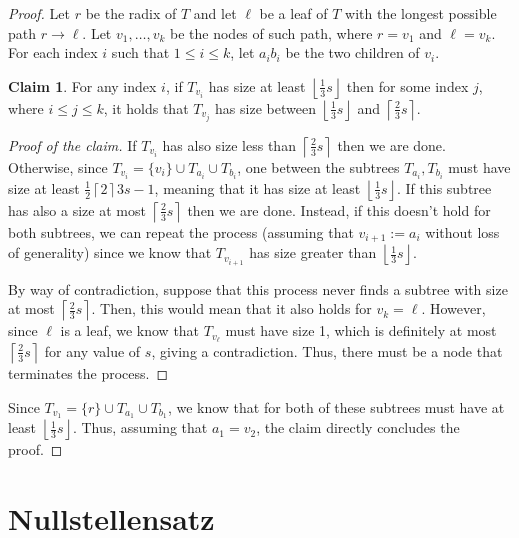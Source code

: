 \documentclass[12pt]{article}
\theoremstyle{definition}
\newtheorem{claimlemma}{Claim}[lemma]
\newcommand{\floor}[1]{\left \lfloor #1 \right \rfloor}
\newcommand{\ceil}[1]{\left \lceil #1 \right \rceil}
\begin{document}
    \begin{proof}
        Let $r$ be the radix of $T$ and let $\ell$ be a leaf of $T$ with the longest possible path $r \to \ell$. Let $v_1, \ldots, v_k$ be the nodes of such path, where $r = v_1$ and $\ell = v_k$. For each index $i$ such that $1 \leq i \leq k$, let $a_i b_i$ be the two children of $v_i$.

        \begin{claimlemma}
            For any index $i$, if $T_{v_i}$ has size at least $\floor{\frac{1}{3} s}$ then for some index $j$, where $i \leq j \leq k$, it holds that $T_{v_j}$ has size between $\floor{\frac{1}{3} s}$ and $\ceil{\frac{2}{3} s}$.
        \end{claimlemma}

        \begin{proof}[Proof of the claim]
            If $T_{v_i}$ has also size less than $\ceil{\frac{2}{3} s}$ then we are done. Otherwise, since $T_{v_i} = \{v_i\} \cup T_{a_i} \cup T_{b_i}$, one between the subtrees $T_{a_i}, T_{b_i}$ must have size at least $\frac{1}{2} \ceil{2}{3} s - 1$, meaning that it has size at least $\floor{\frac{1}{3} s}$. If this subtree has also a size at most $\ceil{\frac{2}{3} s}$ then we are done. Instead, if this doesn't hold for both subtrees, we can repeat the process (assuming that $v_{i+1} := a_i$ without loss of generality) since we know that $T_{v_{i+1}}$ has size greater than $\floor{\frac{1}{3} s}$.

            By way of contradiction, suppose that this process never finds a subtree with size at most $\ceil{\frac{2}{3} s}$. Then, this would mean that it also holds for $v_k = \ell$. However, since $\ell$ is a leaf, we know that $T_{v_\ell}$ must have size 1, which is definitely at most $\ceil{\frac{2}{3} s}$ for any value of $s$, giving a contradiction. Thus, there must be a node that terminates the process.

        \end{proof}
        
        Since $T_{v_1} = \{r\} \cup T_{a_1} \cup T_{b_1}$, we know that for both of these subtrees must have at least $\floor{\frac{1}{3} s}$. Thus, assuming that $a_1 = v_{2}$, the claim directly concludes the proof.
        
    \end{proof}

    \section{Nullstellensatz}
\end{document}
